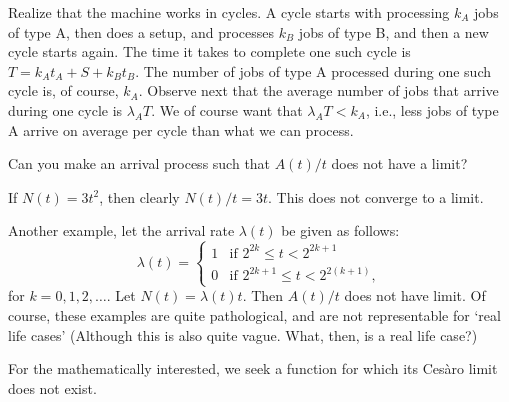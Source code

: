 \begin{question}
  \begin{solution}
    Realize that the machine works in cycles. A cycle starts with
    processing $k_A$ jobs of type A, then does a setup, and processes
    $k_B$ jobs of type B, and then a new cycle starts again.  The time
    it takes to complete one such cycle is $T=k_A t_A + S + k_B t_B$.
    The number of jobs of type A processed during one such cycle is,
    of course, $k_A$. Observe next that the average number of jobs
    that arrive during one cycle is $\lambda_A T$. We of course want
    that $\lambda_A T< k_A$, i.e., less jobs of type A arrive on
    average per cycle than what we can process.
  \end{solution}
\end{question}

\begin{question}
  Can you make an arrival process such that $A(t)/t$ does not have a
  limit?  

  \begin{hint}
    
  \end{hint}
  \begin{solution}
 If $N(t) = 3 t^2$, then clearly $N(t)/t = 3t$. This does not
    converge to a limit. 

  Another example, let the arrival rate $\lambda(t)$ be given as
    follows:
    \begin{equation*}
      \lambda(t) = 
    \begin{cases}
      1 & \text{if } 2^{2k} \leq t < 2^{2k+1} \\
      0 & \text{if } 2^{2k+1} \leq t < 2^{2(k+1)},
    \end{cases}
    \end{equation*}
    for $k=0,1,2,\ldots$. Let $N(t) = \lambda(t) t$. Then $A(t)/t$
    does not have limit. Of course, these examples are quite
    pathological, and are not representable for `real life cases'
    (Although this is also quite vague. What, then, is a real life
    case?)

For the mathematically interested, we seek a
    function for which its Ces\`aro limit does not exist.
  \end{solution}
\end{question}


